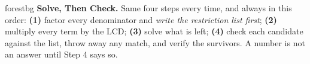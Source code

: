 \documentclass[10pt]{article}
\begin{document}
\namepartnerperiod

\vspace{0.08in}

\begin{headlinebox}{forestbg}
\small\textbf{Solve, Then Check.} Same four steps every time, and always in this order:
\textbf{(1)} factor every denominator and \emph{write the restriction list first}; \textbf{(2)} multiply
every term by the LCD; \textbf{(3)} solve what is left; \textbf{(4)} check each candidate against the
list, throw away any match, and verify the survivors. A number is not an answer until Step 4 says so.
\end{headlinebox}

\vspace{0.06in}
\end{document}
